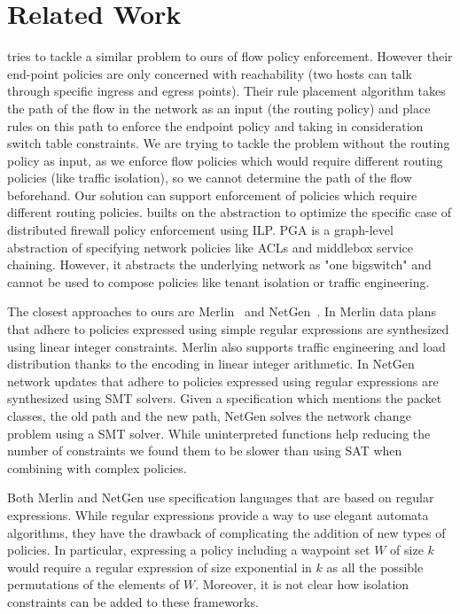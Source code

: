 \section{Related Work}
\cite{oneswitch} tries to tackle a similar problem to ours of flow policy enforcement. However their end-point policies are only concerned with reachability (two hosts can talk through specific ingress and egress points). Their rule placement algorithm takes the path of the flow in the network as an input (the routing policy) and place rules on this path to enforce the endpoint policy and taking in consideration switch table constraints. We are trying to tackle the problem without the routing policy as input, as we enforce flow policies which would require different routing policies (like traffic isolation), so we cannot determine the path of the flow beforehand. Our solution can support enforcement of policies which require different routing policies. \cite{distfirewall} builts on the \cite{oneswitch} abstraction to optimize the specific case of distributed firewall policy enforcement using ILP.  PGA  \cite{pga} is a graph-level abstraction of 
specifying network policies like ACLs and middlebox service chaining. However, it abstracts the underlying network as "one bigswitch" and 
cannot be used to compose policies like tenant isolation or traffic engineering.  

The closest approaches to ours are Merlin~\cite{merlin} and NetGen~\cite{netgen}.
In Merlin data plans that adhere to policies expressed using simple regular expressions are synthesized using linear integer constraints. 
Merlin also supports traffic engineering and load distribution thanks to the encoding in linear integer arithmetic. 
In NetGen network updates that adhere to policies expressed using regular expressions are synthesized using SMT solvers. 
Given a specification which mentions the packet classes, the old path and the new path, NetGen solves the network change problem using a SMT solver. 
While uninterpreted functions help reducing the number of constraints we found them to be slower than using SAT when combining with complex policies. 

Both Merlin and NetGen use specification languages that are based on regular expressions. 
While regular expressions provide a way to 
use elegant automata algorithms, they have the drawback of complicating the addition of new types of policies.
In particular, expressing a policy including a waypoint set $W$ of size $k$ would require a regular expression of size exponential
in $k$ as all the possible permutations of the elements of $W$.
Moreover, it is not clear how isolation constraints can be added to these frameworks.


